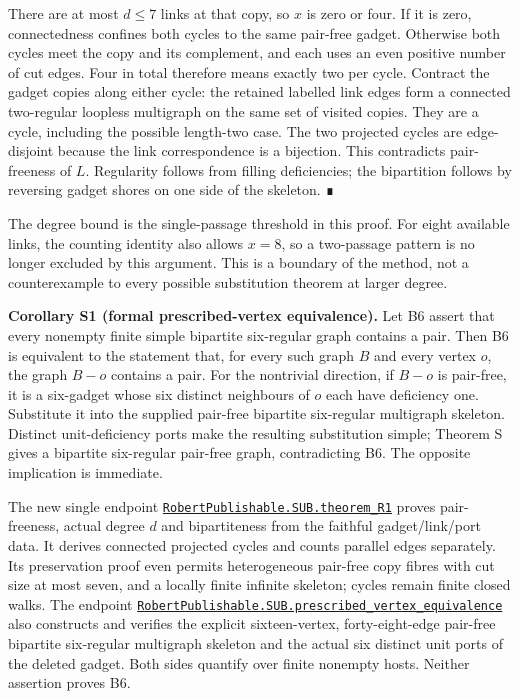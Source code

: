 \documentclass[
  11pt,
]{article}
\newcounter{none} %
\begin{document}
There are at most \(d\leq7\) links at that copy, so \(x\) is zero or
four. If it is zero, connectedness confines both cycles to the same
pair-free gadget. Otherwise both cycles meet the copy and its
complement, and each uses an even positive number of cut edges. Four in
total therefore means exactly two per cycle. Contract the gadget copies
along either cycle: the retained labelled link edges form a connected
two-regular loopless multigraph on the same set of visited copies. They
are a cycle, including the possible length-two case. The two projected
cycles are edge-disjoint because the link correspondence is a bijection.
This contradicts pair-freeness of \(L\). Regularity follows from filling
deficiencies; the bipartition follows by reversing gadget shores on one
side of the skeleton. ∎

The degree bound is the single-passage threshold in this proof. For
eight available links, the counting identity also allows \(x=8\), so a
two-passage pattern is no longer excluded by this argument. This is a
boundary of the method, not a counterexample to every possible
substitution theorem at larger degree.

\textbf{Corollary S1 (formal prescribed-vertex equivalence).} Let B6
assert that every nonempty finite simple bipartite six-regular graph
contains a pair. Then B6 is equivalent to the statement that, for every
such graph \(B\) and every vertex \(o\), the graph \(B-o\) contains a
pair. For the nontrivial direction, if \(B-o\) is pair-free, it is a
six-gadget whose six distinct neighbours of \(o\) each have deficiency
one. Substitute it into the supplied pair-free bipartite six-regular
multigraph skeleton. Distinct unit-deficiency ports make the resulting
substitution simple; Theorem S gives a bipartite six-regular pair-free
graph, contradicting B6. The opposite implication is immediate.

The new single endpoint
\href{https://github.com/alejandrozu/openmath-2026-judging/blob/70c5ec3107658182f22c207d4c50f53f9cb3e602/robert-review-2026-10-07/lean/R1.lean\#L13}{\texttt{RobertPublishable.SUB.theorem\_R1}}
proves pair-freeness, actual degree \(d\) and bipartiteness from the
faithful gadget/link/port data. It derives connected projected cycles
and counts parallel edges separately. Its preservation proof even
permits heterogeneous pair-free copy fibres with cut size at most seven,
and a locally finite infinite skeleton; cycles remain finite closed
walks. The endpoint
\href{https://github.com/alejandrozu/openmath-2026-judging/blob/70c5ec3107658182f22c207d4c50f53f9cb3e602/robert-review-2026-10-07/lean/PrescribedVertex.lean\#L89}{\texttt{RobertPublishable.SUB.prescribed\_vertex\_equivalence}}
also constructs and verifies the explicit sixteen-vertex,
forty-eight-edge pair-free bipartite six-regular multigraph skeleton and
the actual six distinct unit ports of the deleted gadget. Both sides
quantify over finite nonempty hosts. Neither assertion proves B6.
\end{document}
